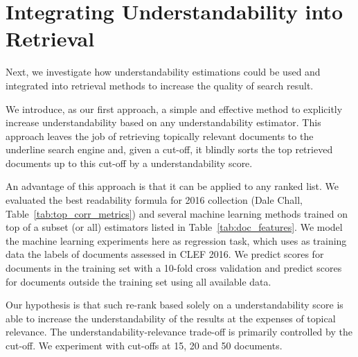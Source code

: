 \section{Integrating Understandability into Retrieval}
\label{sec:experiments}

Next, we investigate how understandability estimations could be used and integrated into retrieval methods to increase the quality of search result. 
%
%
%

We introduce, as our first approach, a simple and effective method to explicitly increase understandability based on any understandability estimator. 
This approach leaves the job of retrieving topically relevant documents to the underline search engine and, given a cut-off, it blindly sorts the top retrieved documents up to this cut-off by a understandability score.

An advantage of this approach is that it can be applied to any ranked list.
We evaluated the best readability formula for 2016 collection (Dale Chall, Table~\ref{tab:top_corr_metrics}) and several machine learning methods trained on top of a subset (or all) estimators listed in Table~\ref{tab:doc_features}. We model the machine learning experiments here as regression task, which uses as training data the labels of documents assessed in CLEF 2016.
We predict scores for documents in the training set with a 10-fold cross validation and predict scores for documents outside the training set using all available data.

Our hypothesis is that such re-rank based solely on a understandability score is able to increase the understandability of the results at the expenses of topical relevance. The understandability-relevance trade-off is primarily controlled by the cut-off. We experiment with cut-offs at 15, 20 and 50 documents. 

